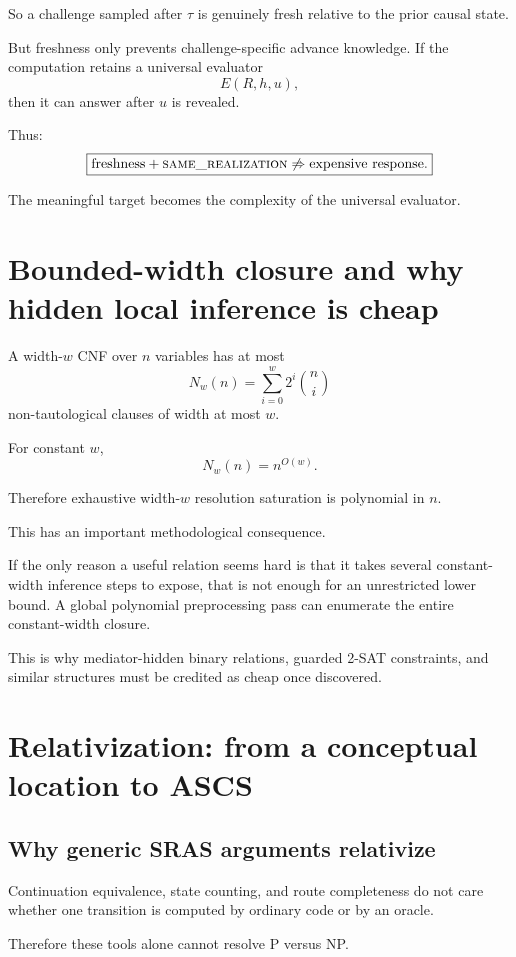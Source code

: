 \documentclass[11pt]{article}
\newcommand{\same}{\textsc{same\_realization}}
\theoremstyle{plain}
\theoremstyle{definition}
\theoremstyle{remark}
\begin{document}
So a challenge sampled after \(\tau\) is genuinely fresh relative to the prior
causal state.

But freshness only prevents challenge-specific advance knowledge.  If the
computation retains a universal evaluator
\[
E(R,h,u),
\]
then it can answer after \(u\) is revealed.

Thus:
\[
\boxed{
\text{freshness}+\same
\not\Rightarrow
\text{expensive response}.
}
\]

The meaningful target becomes the complexity of the universal evaluator.

\section{Bounded-width closure and why hidden local inference is cheap}

A width-\(w\) CNF over \(n\) variables has at most
\[
N_w(n)
=
\sum_{i=0}^{w}
2^i\binom ni
\]
non-tautological clauses of width at most \(w\).

For constant \(w\),
\[
N_w(n)=n^{O(w)}.
\]

Therefore exhaustive width-\(w\) resolution saturation is polynomial in \(n\).

This has an important methodological consequence.

If the only reason a useful relation seems hard is that it takes several
constant-width inference steps to expose, that is not enough for an
unrestricted lower bound.  A global polynomial preprocessing pass can
enumerate the entire constant-width closure.

This is why mediator-hidden binary relations, guarded 2-SAT constraints, and
similar structures must be credited as cheap once discovered.

\section{Relativization: from a conceptual location to ASCS}

\subsection{Why generic SRAS arguments relativize}

Continuation equivalence, state counting, and route completeness do not care
whether one transition is computed by ordinary code or by an oracle.

Therefore these tools alone cannot resolve P versus NP.
\end{document}

